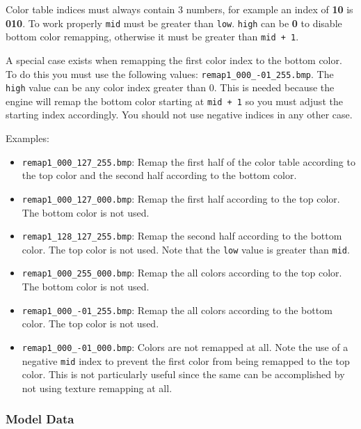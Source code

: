 \documentclass[10pt, a4paper, titlepage, oneside]{article}
\newcommand{\code}[1]{\mbox{\texttt{#1}}}
\begin{document}
Color table indices must always contain 3 numbers, for example an index of \textbf{10} is \textbf{010}. To work properly \code{mid} must be greater than \code{low}. \code{high} can be \textbf{0} to disable bottom color remapping, otherwise it must be greater than \code{mid + 1}.

\vspace{\baselineskip}
A special case exists when remapping the first color index to the bottom color. To do this you must use the following values: \code{remap1\_000\_-01\_255.bmp}. The \code{high} value can be any color index greater than 0. This is needed because the engine will remap the bottom color starting at \code{mid + 1} so you must adjust the starting index accordingly. You should not use negative indices in any other case.

\vspace{\baselineskip}

Examples:
\begin{itemize}
\item \code{remap1\_000\_127\_255.bmp}: Remap the first half of the color table according to the top color and the second half according to the bottom color.
\item \code{remap1\_000\_127\_000.bmp}: Remap the first half according to the top color. The bottom color is not used.
\item \code{remap1\_128\_127\_255.bmp}: Remap the second half according to the bottom color. The top color is not used. Note that the \code{low} value is greater than \code{mid}.
\item \code{remap1\_000\_255\_000.bmp}: Remap the all colors according to the top color. The bottom color is not used.
\item \code{remap1\_000\_-01\_255.bmp}: Remap the all colors according to the bottom color. The top color is not used.
\item \code{remap1\_000\_-01\_000.bmp}: Colors are not remapped at all. Note the use of a negative \code{mid} index to prevent the first color from being remapped to the top color. This is not particularly useful since the same can be accomplished by not using texture remapping at all.
\end{itemize}

\newpage

\subsubsection{Model Data}
\end{document}
